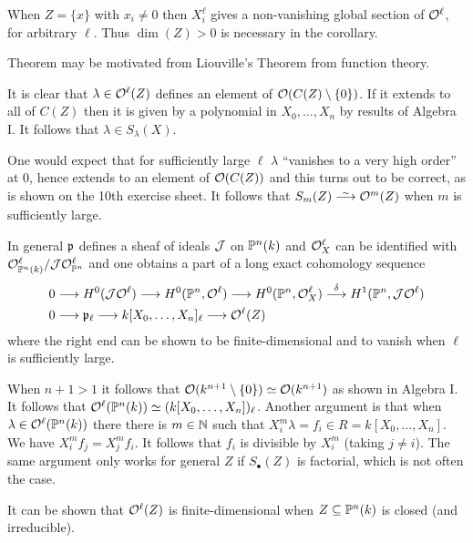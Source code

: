 \documentclass[a4paper,parskip=half,numbers=enddot, DIV=12]{scrreprt}
\begin{document}
\begin{rem*}
    \begin{alphanumerate}
        \item 
            When $Z=\{x\}$ with $x_i\neq 0$ then $X_i^\ell$ gives a non-vanishing global section of $\mathcal{O}^\ell$, for arbitrary $\ell$. Thus $\dim(Z)>0$ is necessary in the corollary.
        \item 
            Theorem  may be motivated from Liouville's Theorem from function theory.
        \item   
            It is clear that $\lambda\in \mathcal{O}^\ell(Z)$ defines an element of $\mathcal{O}(C(Z)\setminus\{0\})$. If it extends to all of $C(Z)$ then it is given by a polynomial in $X_0,\ldots, X_n$ by results of Algebra I. It follows that $\lambda\in S_\lambda(X)$.
            
            One would expect that for sufficiently large $\ell$ $\lambda$ ``vanishes to a very high order'' at $0$, hence extends to an element of $\mathcal{O}(C(Z))$ and this turns out to be correct, as is shown on the 10th exercise sheet. It follows that $S_m(Z) \isomorphism \Oo^m(Z)$ when $m$ is sufficiently large.
        \item 
            In general $\mathfrak{p}$ defines a sheaf of ideals $\mathcal{J}$ on $\mathbb{P}^n(k)$ and $\mathcal{O}^\ell_X$ can be identified with $\mathcal{O}^\ell_{\mathbb{P}^n(k)}/\mathcal{J}\mathcal{O}^\ell_{\mathbb{P}^n}$ and one obtains a part of a long exact cohomology sequence
            \begin{align*}
                0&\morphism H^0(\Jj\Oo^\ell) \morphism H^0(\IP^n, \Oo^\ell) \morphism H^0(\IP^n, \Oo^\ell_X) \morphism[\delta] H^1(\IP^n, \Jj\Oo^\ell)\\
                0 &\morphism \pp_\ell \morphism k[X_0,\ldots, X_n]_\ell \morphism \Oo^\ell(Z)
            \end{align*}
            where the right end can be shown to be finite-dimensional and to vanish when $\ell$ is sufficiently large.
        \item 
            When $n+1>1$ it follows that $\mathcal{O}(k^{n+1}\setminus\{0\}) \simeq \mathcal{O}(k^{n+1})$ as shown in Algebra I. It follows that $\mathcal{O}^\ell(\mathbb{P}^n(k)) \simeq (k[X_0,\ldots, X_n])_\ell$. Another argument is that when $\lambda\in \mathcal{O}^\ell(\mathbb{P}^n(k))$ there there is $m\in \mathbb{N}$ such that $X_i^m\lambda = f_i\in R= k[X_0,\ldots, X_n]$. We have $X_i^mf_j = X_j^mf_i$. It follows that $f_i$ is divisible by $X_i^m$ (taking $j\neq i$). The same argument only works for general $Z$ if $S_\bullet(Z)$ is factorial, which is not often the case. 
        \item
            It can be shown that $\mathcal{O}^\ell(Z)$ is finite-dimensional when $Z\subseteq \mathbb{P}^n(k)$ is closed (and irreducible). 
    \end{alphanumerate}
\end{rem*}
\end{document}
